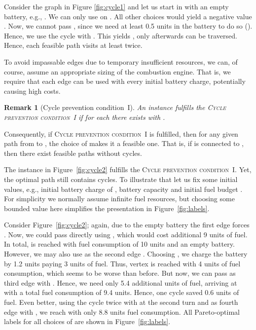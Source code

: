 \documentclass[a4paper]{scrartcl}
\newtheorem{remark}[theorem]{Remark}
\begin{document}
Consider the graph in Figure \ref{fig:cycle1} and let us start  in  with an empty battery, e.g., . We can only use  on . All other choices would yield a negative value . Now, we cannot pass , since we need at least 0.5 units in the battery to do so (). Hence, we use the cycle  with . This yields , only afterwards  can be traversed. Hence, each feasible path visits  at least twice.

To avoid impassable edges due to temporary insufficient resources, we can, of course, assume an appropriate sizing of the combustion engine. That is, we require that each edge can be used with every initial battery charge, potentially causing high costs.

\begin{remark}[Cycle prevention condition~I] \label{remark:alpha0}
An instance fulfills the \textsc{Cycle prevention condition~I} if for each  there exists  with .
\end{remark}

Consequently, if \textsc{Cycle prevention condition~I} is fulfilled, then for any given path from  to , the choice of  makes it a feasible one. That is, if  is connected to , then there exist feasible paths without cycles.

The instance in Figure~\ref{fig:cycle2} fulfills the \textsc{Cycle prevention condition~I}. Yet, the optimal path still contains cycles. To illustrate that let us fix some initial values, e.g., initial battery charge of , battery capacity  and initial fuel budget . For simplicity we normally assume infinite fuel resources, but choosing some bounded value here simplifies the presentation in Figure~\ref{fig:labels}. 

Consider Figure~\ref{fig:cycle2}; again, due to the empty battery the first edge forces . Now, we could pass  directly using , which would cost additional 9 units of fuel. In total,  is reached with fuel consumption of 10 units  and an empty battery. However, we may also use  as the second edge . Choosing , we charge the battery by 1.2 units paying 3 units of fuel. Thus, vertex  is reached with 4 units of fuel consumption, which seems to be worse than before. But now, we can pass  as third edge  with . Hence, we need only 5.4 additional units of fuel, arriving at  with a total fuel consumption of 9.4 units. Hence, one cycle saved 0.6 units of fuel. Even better, using the cycle twice with  at the second turn and  as fourth edge with , we reach  with only 8.8 units fuel consumption. All Pareto-optimal labels for all choices of  are shown in Figure~\ref{fig:labels}.  
\end{document}
